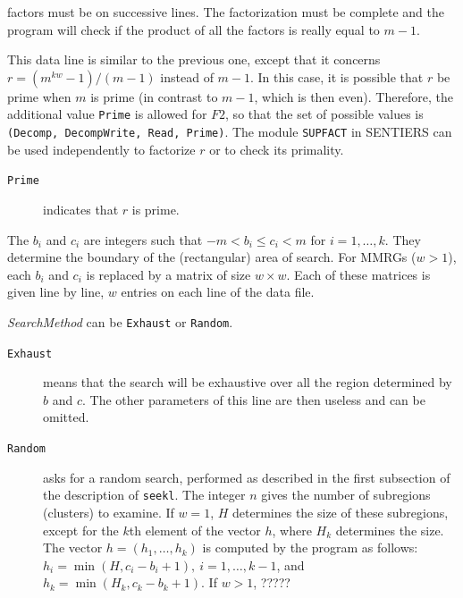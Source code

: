 \begin {description}
\begin {description}
    factors must be on successive lines.  The factorization must be
    complete and the program will check if the product of all the factors
    is really equal to $m-1$.
  \end {description}
%
\item [$F2$ and \<{\em file2}\> :]
  This data line is similar to the previous one, except that it concerns
  $r=(m^{kw}-1)/(m-1)$ instead of $m-1$.
  In this case, it is possible that $r$ be prime when $m$ is prime
  (in contrast to $m-1$, which is then even).  
  Therefore, the additional value {\tt Prime} is
  allowed for $F2$, so that the set of possible values is
  {\tt (Decomp, DecompWrite, Read, Prime)}.
  The module {\tt SUPFACT} in SENTIERS \cite{iLEC88d} can be used independently
  to factorize $r$ or to check its primality.
  \begin {description}
  \item [{\tt Prime}] indicates that $r$ is prime.
  \end {description}
%
\item [$b=(b_1,\ldots,b_k)$ \rm and $c=(c_1,\ldots,c_k)$~:]
  The $b_i$ and $c_i$ are integers such that
  $-m < b_i \le c_i < m$ for $i=1,\dots,k$.
  They determine the boundary of the (rectangular) area of search.
  For MMRGs ($w>1$), each $b_i$ and $c_i$ is replaced by a matrix of
  size $w\times w$.  Each of these matrices is given line by line,
  $w$ entries on each line of the data file.
%
\item [{\em SearchMethod} and $n,\, H,\, H_k$ :]
  {\em SearchMethod} can be {\tt Exhaust} or {\tt Random}.
  \begin {description}
  \item  [{\tt Exhaust}] means that the search will be exhaustive over
    all the region determined by $b$ and $c$.
    The other parameters of this line are then useless and can be omitted.
  \item  [{\tt Random}] asks for a random search, performed as described
    in the first subsection of the description of {\tt seekl}.
    The integer $n$ gives the number of subregions (clusters) to examine. 
    If $w=1$, $H$ determines the size of these subregions, except for
    the $k$th element of the vector $h$, where $H_k$ determines the size.
    The vector $h=(h_1,\ldots,h_k)$ is computed by the program as follows:
    $h_i = \min (H, c_i-b_i+1),\ i=1,\ldots,k-1$, and
    $h_k = \min (H_k, c_k-b_k+1)$.
    If $w > 1$, ?????

\end{description}
\end{description}
